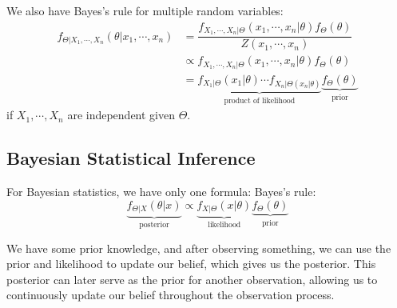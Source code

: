 We also have Bayes's rule for multiple random variables:
\[
  \begin{aligned}
    f_{\Theta \vert X_1, \cdots, X_n} (\theta \vert x_1, \cdots, x_n) &= \dfrac{f_{X_1, \cdots, X_n \vert \Theta} (x_1, \cdots, x_n \vert \theta) f_{\Theta} (\theta)}{Z(x_1, \cdots, x_n)} \\
    &\propto f_{X_1, \cdots, X_n \vert \Theta} (x_1, \cdots, x_n \vert \theta) f_{\Theta} (\theta) \\ 
    &= \underbrace{f_{X_1 \vert \Theta} (x_1 \vert \theta) \cdots f_{X_n  \vert \Theta(x_n \vert \theta)}}_{\text{product of likelihood}} \underbrace{f_{\Theta} (\theta)}_{\text{prior}}
  \end{aligned}
\]
if \(X_1, \cdots, X_n\) are independent given \(\Theta\).  

\subsection{Bayesian Statistical Inference}
For Bayesian statistics, we have only one formula: Bayes’s rule: 
\[
  \underbrace{f_{\Theta \vert X} (\theta \vert x)}_{\text{posterior}} \propto \underbrace{f_{X \vert \Theta} (x \vert \theta)}_{\text{likelihood}} \underbrace{f_{\Theta} (\theta)}_{\text{prior}}
\]

We have some prior knowledge, and after observing something, we can use the prior and likelihood to update our belief, which gives us the posterior. This posterior can later serve as the prior for another observation, allowing us to continuously update our belief throughout the observation process.


